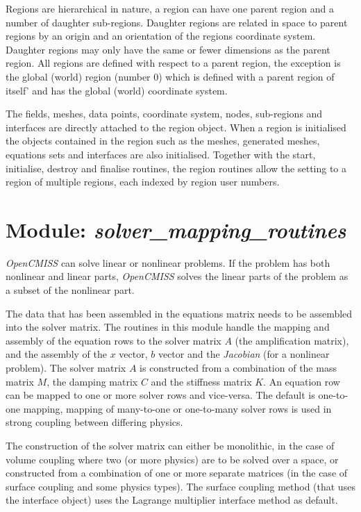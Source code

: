 Regions are hierarchical in nature, a region can have one parent region and a 
number of daughter sub-regions. Daughter regions are related in space to 
parent regions by an origin and an orientation of the regions coordinate 
system. Daughter regions may only have the same or fewer dimensions as the 
parent region. All regions are defined with respect to a parent region, the 
exception is the global (world) region (number $0$) which is defined with a 
parent region of itself' and has the global (world) coordinate system.
  
The fields, meshes, data points, coordinate system, nodes, sub-regions and 
interfaces are directly attached to the region object. When a region is 
initialised the objects contained in the region such as the meshes, generated 
meshes, equations sets and interfaces are also initialised. Together with the 
start, initialise, destroy and finalise routines, the region routines allow 
the setting to a region of multiple regions, each indexed by region user 
numbers.


\section{Module: \emph{solver\_mapping\_routines}}
\label{sec:solvermappingroutines}

\emph{OpenCMISS} can solve linear or nonlinear problems. If the problem has 
both nonlinear and linear parts, \emph{OpenCMISS} solves the linear parts 
of the problem as a subset of the nonlinear part.

The data that has been assembled in the equations matrix needs to be assembled 
into the solver matrix. The routines in this module handle the mapping and 
assembly of the equation rows to the solver matrix $A$ (the amplification 
matrix), and the assembly of the $x$ vector, $b$ vector and the \emph{Jacobian} 
(for a nonlinear problem). The solver matrix $A$ is constructed from a 
combination of the mass matrix $M$, the damping matrix $C$ and the stiffness 
matrix $K$. An equation row can be mapped to one or more solver rows and 
vice-versa. The default is one-to-one mapping, mapping of many-to-one or 
one-to-many solver rows is used in strong coupling between differing physics.

The construction of the solver matrix can either be monolithic, in the case of
volume coupling where two (or more physics) are to be solved over a space, or
constructed from a combination of one or more separate matrices (in the case of
surface coupling and some physics types). The surface coupling method (that
uses the interface object) uses the Lagrange multiplier interface method as 
default.

